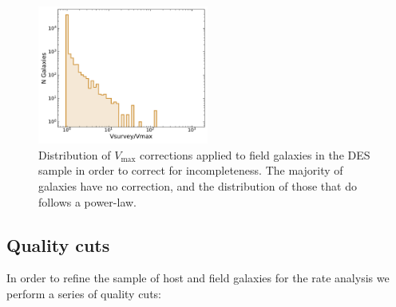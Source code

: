 \documentclass[fleqn,usenatbib]{mnras}
\begin{document}
\begin{figure}
    \centering
    \includegraphics[width=0.5\textwidth]{figs/field_vmax.pdf}
    \caption{Distribution of $V_{\mathrm{max}}$ corrections applied to field galaxies in the DES sample in order to correct for incompleteness. The majority of galaxies have no correction, and the distribution of those that do follows a power-law.
    \label{fig:vmax_field}}
\end{figure}

\subsection{Quality cuts \label{subsec:cuts}}

In order to refine the sample of host and field galaxies for the rate analysis we perform a series of quality cuts:
\end{document}
